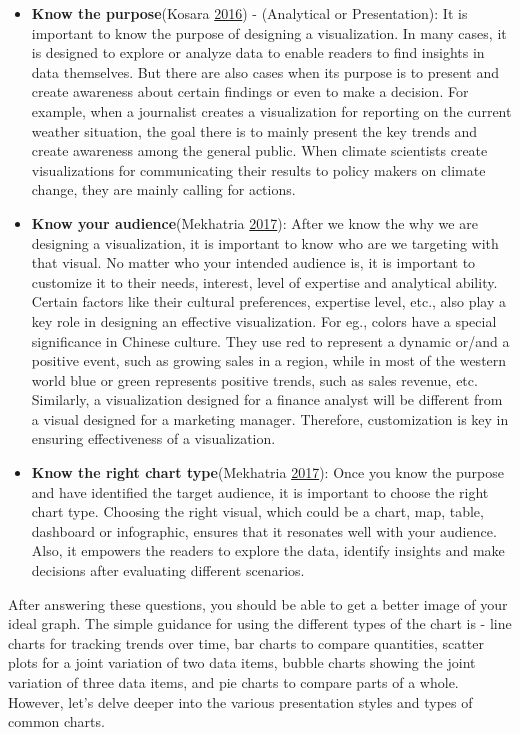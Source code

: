 \documentclass[]{book}
\begin{document}
\begin{itemize}
\item
  \textbf{Know the purpose}(Kosara \protect\hyperlink{ref-chart_purpose}{2016}) - (Analytical or Presentation): It is important to know the purpose of designing a visualization. In many cases, it is designed to explore or analyze data to enable readers to find insights in data themselves. But there are also cases when its purpose is to present and create awareness about certain findings or even to make a decision. For example, when a journalist creates a visualization for reporting on the current weather situation, the goal there is to mainly present the key trends and create awareness among the general public. When climate scientists create visualizations for communicating their results to policy makers on climate change, they are mainly calling for actions.
\item
  \textbf{Know your audience}(Mekhatria \protect\hyperlink{ref-chart_audience}{2017}): After we know the why we are designing a visualization, it is important to know who are we targeting with that visual. No matter who your intended audience is, it is important to customize it to their needs, interest, level of expertise and analytical ability. Certain factors like their cultural preferences, expertise level, etc., also play a key role in designing an effective visualization. For eg., colors have a special significance in Chinese culture. They use red to represent a dynamic or/and a positive event, such as growing sales in a region, while in most of the western world blue or green represents positive trends, such as sales revenue, etc. Similarly, a visualization designed for a finance analyst will be different from a visual designed for a marketing manager. Therefore, customization is key in ensuring effectiveness of a visualization.
\item
  \textbf{Know the right chart type}(Mekhatria \protect\hyperlink{ref-chart_audience}{2017}): Once you know the purpose and have identified the target audience, it is important to choose the right chart type. Choosing the right visual, which could be a chart, map, table, dashboard or infographic, ensures that it resonates well with your audience. Also, it empowers the readers to explore the data, identify insights and make decisions after evaluating different scenarios.
\end{itemize}

After answering these questions, you should be able to get a better image of your ideal graph. The simple guidance for using the different types of the chart is - line charts for tracking trends over time, bar charts to compare quantities, scatter plots for a joint variation of two data items, bubble charts showing the joint variation of three data items, and pie charts to compare parts of a whole. However, let's delve deeper into the various presentation styles and types of common charts.
\end{document}
